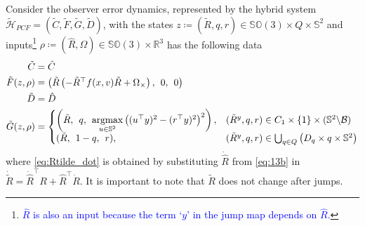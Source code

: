 \documentclass{article}
\newcommand{\SOthree}{\mathbb{SO}(3)}
\newcommand{\R}[1]{\mathbb{R}^{#1}}
\newtheorem{theorem}{Theorem}
\newcommand{\brackets}[1]{\left(#1\right)}
\newcommand{\textblue}[1]{\textcolor{blue}{#1}}
\newcommand{\Rtilde}{\tilde{R}}
\begin{document}
Consider the observer error dynamics, represented by the hybrid system $\tilde{\mathcal{H}}_{PCF} = (\tilde{C}, \tilde{F}, \tilde{G}, \tilde{D})$, with the states $z \coloneqq (\Rtilde, q, r) \in \SOthree\times Q \times \mathbb{S}^2$ and inputs\footnote{\textblue{$\hat{R}$ is also an input because the term `$y$' in the jump map depends on $\hat{R}$.}} $\rho \coloneqq (\hat{R}, \Omega)\in\SOthree\times \R{3}$ has the following data
\begin{subequations}\label{eq:hybrid_observer_error}
\begin{align}
\tilde{C}& = \hat{C}\\
\tilde{F}(z, \rho)& = \begin{pmatrix}
    \Rtilde\brackets{-\Rtilde^\top f(x, v) \Rtilde + \Omega_\times}, \:\: 0, \:\: 0\end{pmatrix} \label{eq:Rtilde_dot}\\
\tilde{D} &= \hat{D}\\
\tilde{G}(z, \rho) &= \left\{\begin{array}{@{}ll@{}}
    \brackets{\tilde{R}, \:\: q,\:\: \underset{u\in\mathbb{S}^2}{\mathrm{argmax}}\left((u^\top y)^2 - (r^\top y)^2\right)^2}, &(\Rtilde^y, q, r)\in C_1\times \{1\}\times (\mathbb{S}^2\backslash \mathcal{B})\\
        (\tilde{R}, \:\: 1-q,\:\: r),
    &(\Rtilde^y, q, r)\in \bigcup_{q\in Q} \brackets{{D}_{q}\times q\times \mathbb{S}^2}
\end{array}\right.
\end{align}
\end{subequations}
where \eqref{eq:Rtilde_dot} is obtained by substituting $\dot{\hat{R}}$ from \eqref{eq:13b} in $\dot{\Rtilde} = \dot{\hat{R}}^\top R + \hat{R}^\top \dot{R}$. It is important to note that $\Rtilde$ does not change after jumps. 

\end{document}
